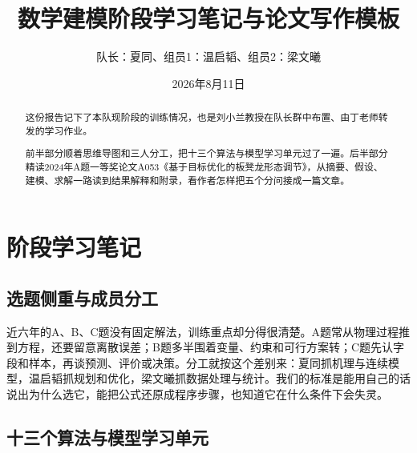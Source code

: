\documentclass[UTF8,zihao=-4]{ctexart}
\title{\bfseries 数学建模阶段学习笔记与论文写作模板}
\author{队长：夏同、组员1：温启韬、组员2：梁文曦}
\date{2026年8月11日}
\begin{document}
\maketitle

\begin{abstract}
这份报告记下了本队现阶段的训练情况，也是刘小兰教授在队长群中布置、由丁老师转发的学习作业。

前半部分顺着思维导图和三人分工，把十三个算法与模型学习单元过了一遍。后半部分精读2024年A题一等奖论文A053《基于目标优化的板凳龙形态调节》，从摘要、假设、建模、求解一路读到结果解释和附录，看作者怎样把五个分问接成一篇文章。

\end{abstract}

\tableofcontents
\newpage

\section{阶段学习笔记}

\subsection{选题侧重与成员分工}

近六年的A、B、C题没有固定解法，训练重点却分得很清楚。A题常从物理过程推到方程，还要留意离散误差；B题多半围着变量、约束和可行方案转；C题先认字段和样本，再谈预测、评价或决策。分工就按这个差别来：夏同抓机理与连续模型，温启韬抓规划和优化，梁文曦抓数据处理与统计。我们的标准是能用自己的话说出为什么选它，能把公式还原成程序步骤，也知道它在什么条件下会失灵。

\subsection{十三个算法与模型学习单元}
\end{document}
